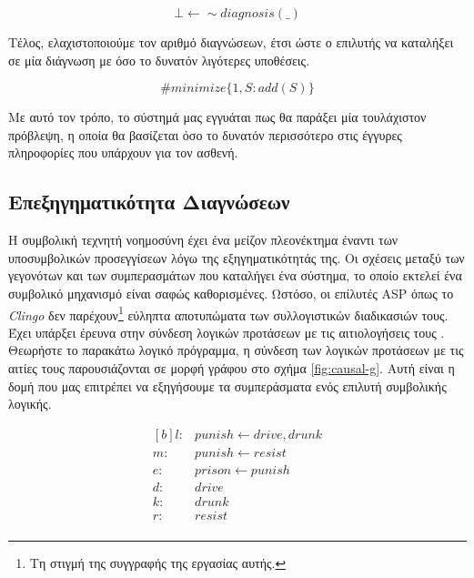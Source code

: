 \documentclass[10pt,leqno]{amsart}
\begin{document}
\begin{equation}
    \bot \longleftarrow \sim diagnosis(\_)
\end{equation}

Τέλος, ελαχιστοποιούμε τον αριθμό  διαγνώσεων, έτσι ώστε ο επιλυτής 
να καταλήξει σε μία διάγνωση με όσο το δυνατόν λιγότερες υποθέσεις.

\begin{equation}
    \#minimize \{ 1, S : add(S) \}
\end{equation}

Με αυτό τον τρόπο, το σύστημά μας εγγυάται πως θα παράξει μία τουλάχιστον πρόβλεψη, η οποία 
θα βασίζεται όσο το δυνατόν περισσότερο στις έγγυρες πληροφορίες που υπάρχουν για τον ασθενή.

\subsection{Επεξηγηματικότητα Διαγνώσεων}

Η συμβολική τεχνητή νοημοσύνη έχει ένα μείζον πλεονέκτημα έναντι των υποσυμβολικών προσεγγίσεων λόγω της εξηγηματικότητάς της.
Οι σχέσεις μεταξύ των γεγονότων και των συμπερασμάτων που καταλήγει ένα σύστημα, το οποίο εκτελεί ένα συμβολικό μηχανισμό είναι σαφώς καθορισμένες.
Ωστόσο, οι επίλυτές ASP όπως το \textit{Clingo} δεν παρέχουν\footnote{Τη στιγμή της συγγραφής της εργασίας αυτής.} εύληπτα αποτυπώματα των συλλογιστικών διαδικασιών τους.
Έχει υπάρξει έρευνα στην σύνδεση λογικών προτάσεων 
με τις αιτιολογήσεις τους \cite{cabalar2014causal}.
Θεωρήστε το παρακάτω λογικό πρόγραμμα, η σύνδεση των λογικών προτάσεων με τις αιτίες τους παρουσιάζονται 
σε μορφή γράφου στο σχήμα \ref{fig:causal-g}. Αυτή είναι η δομή που μας επιτρέπει 
να εξηγήσουμε τα συμπεράσματα ενός επιλυτή συμβολικής λογικής.

\begin{equation}
\begin{aligned}[b]
    l :& punish \longleftarrow drive, drunk \\
    m :& punish \longleftarrow resist \\
    e :& prison \longleftarrow punish \\
    d :& drive \\
    k :& drunk \\
    r :& resist \\
\end{aligned}
\label{eq:example-cg}
\end{equation}
\end{document}
